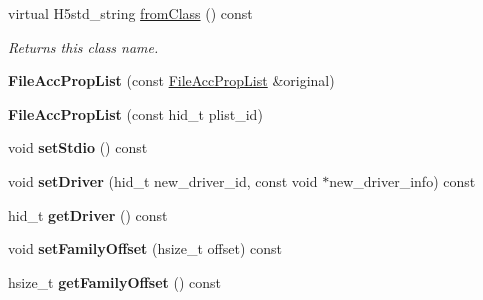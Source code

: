 \begin{DoxyCompactItemize}
\item 
\mbox{\label{class_h5_1_1_file_acc_prop_list_a91008d21823c623382ab9c6e6640f67d}} 
virtual H5std\+\_\+string \hyperlink{class_h5_1_1_file_acc_prop_list_a91008d21823c623382ab9c6e6640f67d}{from\+Class} () const
\begin{DoxyCompactList}\small\item\em Returns this class name. \end{DoxyCompactList}\item 
\mbox{\label{class_h5_1_1_file_acc_prop_list_acc36fcd3f6528a94c5521048b1350716}} 
{\bfseries File\+Acc\+Prop\+List} (const \hyperlink{class_h5_1_1_file_acc_prop_list}{File\+Acc\+Prop\+List} \&original)
\item 
\mbox{\label{class_h5_1_1_file_acc_prop_list_abc2e5471cd17a7ff0b81d2cab58aead8}} 
{\bfseries File\+Acc\+Prop\+List} (const hid\+\_\+t plist\+\_\+id)
\item 
\mbox{\label{class_h5_1_1_file_acc_prop_list_a4c521836c5a0b26ef1308f8aa2c5fa60}} 
void {\bfseries set\+Stdio} () const
\item 
\mbox{\label{class_h5_1_1_file_acc_prop_list_ad4b3a3ef6c4bf48dc61dacb2532fd8d1}} 
void {\bfseries set\+Driver} (hid\+\_\+t new\+\_\+driver\+\_\+id, const void $\ast$new\+\_\+driver\+\_\+info) const
\item 
\mbox{\label{class_h5_1_1_file_acc_prop_list_a1e7bfe651b895aac4c2a31427a85b0f0}} 
hid\+\_\+t {\bfseries get\+Driver} () const
\item 
\mbox{\label{class_h5_1_1_file_acc_prop_list_a82c89cd7c0ca3256e793f7630d3aaf17}} 
void {\bfseries set\+Family\+Offset} (hsize\+\_\+t offset) const
\item 
\mbox{\label{class_h5_1_1_file_acc_prop_list_ab7e2702ed9c5e4940fff289bbe88e9ec}} 
hsize\+\_\+t {\bfseries get\+Family\+Offset} () const
\item 
\mbox{\label{class_h5_1_1_file_acc_prop_list_a515207f6e67b74cc5bf63def0cb3b562}} 

\end{DoxyCompactItemize}
